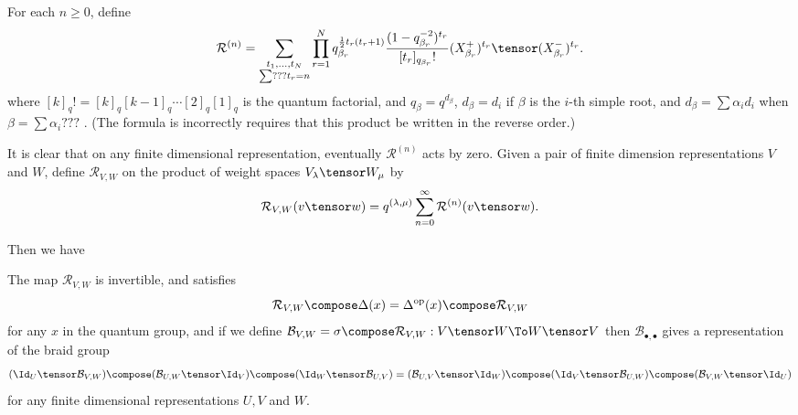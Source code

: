 For each $n\geq0$, define
\begin{equation}
\mathcal{R}^{(n)} = \sum_{\substack{t_1, \ldots, t_N \\ \sum ??? t_r = n}} \prod_{r=1}^N q_{\beta_r}^{\frac{1}{2}t_r(t_r+1)} \frac{(1-q_{\beta_r}^{-2})^{t_r}}{[t_r]_{q_{\beta_r}}!} (X_{\beta_r}^+)^{t_r} \tensor (X_{\beta_r}^-)^{t_r}.
\end{equation}
where $[k]_q! = [k]_q [k-1]_q \cdots [2]_q [1]_q$ is the quantum factorial, and $q_\beta = q^{d_\beta}$, $d_\beta = d_i$ if $\beta$ is the $i$-th simple root, and $d_\beta = \sum \alpha_i d_i$ when $\beta = \sum \alpha_i ???$ .
(The formula is \cite{CP} incorrectly requires that this product be written in the reverse order.)

It is clear that on any finite dimensional representation, eventually $\mathcal{R}^{(n)}$ acts by zero. Given a pair of finite dimension representations $V$ and $W$,
define $\mathcal{R}_{V,W}$ on the product of weight spaces $V_\lambda \tensor W_\mu$ by
\begin{equation}
\mathcal{R}_{V,W}(v\tensor w) = q^{(\lambda,\mu)} \sum_{n=0}^\infty \mathcal{R}^{(n)}(v \tensor w).
\end{equation}

Then we have \cite[Proposition 10.1.19]{CP}
\begin{prop}
The map $\mathcal{R}_{V,W}$ is invertible, and satisfies
\begin{equation*}
\mathcal{R}_{V,W} \compose \Delta(x) = \Delta^{\text{op}}(x) \compose \mathcal{R}_{V,W}
\end{equation*}
for any $x$ in the quantum group, and if we define $\mathcal{B}_{V,W} = \sigma \compose \mathcal{R}_{V,W} : V \tensor W \To W \tensor V$ then $\mathcal{B}_{\bullet,\bullet}$ gives a representation of the braid group
\begin{equation*}
(\Id_U \tensor \mathcal{B}_{V,W}) \compose (\mathcal{B}_{U,W}\tensor \Id_V) \compose (\Id_W\tensor\mathcal{B}_{U,V}) = (\mathcal{B}_{U,V}\tensor\Id_W) \compose (\Id_V\tensor\mathcal{B}_{U,W}) \compose (\mathcal{B}_{V,W}\tensor\Id_U)
\end{equation*}
for any finite dimensional representations $U, V$ and $W$.
\end{prop}


\subsection{}
